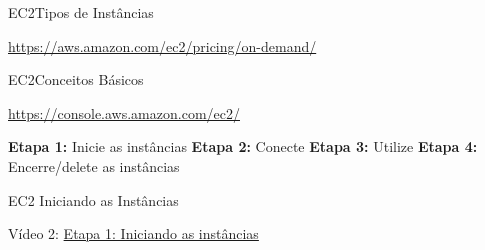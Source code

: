 \documentclass[xcolor=table]{beamer}
\begin{document}
\begin{frame}[c]{EC2}{Tipos de Instâncias}

    \begin{center}
        \begin{outline}
            \1[]\url{https://aws.amazon.com/ec2/pricing/on-demand/}
        \end{outline}
        \vspace{0.5cm}
            
                
    \end{center}
          
            
            
            
            
       
\end{frame}


\begin{frame}[c]{EC2}{Conceitos Básicos}

        \begin{outline}
            \1[]\url{https://console.aws.amazon.com/ec2/}
        \end{outline}
        
        
        \begin{center}
            \begin{outline}                
               \1[] \textbf{Etapa 1:} Inicie as instâncias
               \1[] \textbf{Etapa 2:} Conecte
               \1[] \textbf{Etapa 3:} Utilize
               \1[] \textbf{Etapa 4:} Encerre/\alert{delete} as instâncias
            \end{outline}
        \end{center}

\end{frame}


\begin{frame}[c]{EC2} {Iniciando as Instâncias}

        \begin{center}
            Vídeo 2: \href{run:./2_running.ogv}{Etapa 1: Iniciando as instâncias}
        \end{center}  

\end{frame}
\end{document}

